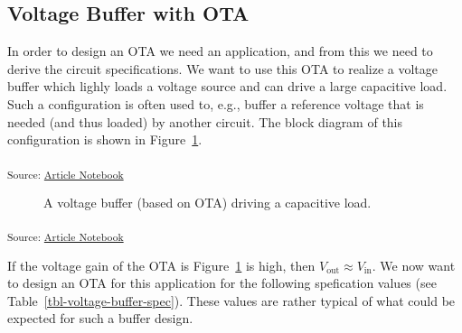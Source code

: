 \documentclass[
  a4paper,
  DIV=11,
  numbers=noendperiod]{scrartcl}
\begin{document}
\subsection{Voltage Buffer with OTA}\label{voltage-buffer-with-ota}

In order to design an OTA we need an application, and from this we need
to derive the circuit specifications. We want to use this OTA to realize
a voltage buffer which lighly loads a voltage source and can drive a
large capacitive load. Such a configuration is often used to, e.g.,
buffer a reference voltage that is needed (and thus loaded) by another
circuit. The block diagram of this configuration is shown in
Figure~\ref{fig-voltage-buffer-ota}.

\textsubscript{Source:
\href{https://iic-jku.github.io/analog-circuit-design/index.qmd.html}{Article
Notebook}}

\begin{figure}[H]


\caption{\label{fig-voltage-buffer-ota}A voltage buffer (based on OTA)
driving a capacitive load.}

\end{figure}%

\textsubscript{Source:
\href{https://iic-jku.github.io/analog-circuit-design/index.qmd.html}{Article
Notebook}}

If the voltage gain of the OTA is Figure~\ref{fig-voltage-buffer-ota} is
high, then \(V_\mathrm{out} \approx V_\mathrm{in}\). We now want to
design an OTA for this application for the following spefication values
(see Table~\ref{tbl-voltage-buffer-spec}). These values are rather
typical of what could be expected for such a buffer design.
\end{document}
